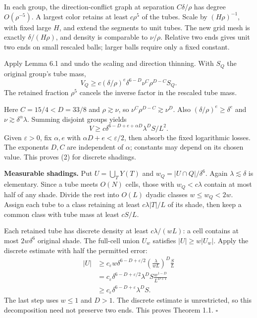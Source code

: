 \documentclass[
  11pt,
  a4paper,
]{article}
\begin{document}
In each group, the direction-conflict graph at separation
\(C\delta/\rho\) has degree \(O(\rho^{-5})\). A largest color retains at
least \(c\rho^5\) of the tubes. Scale by \((H\rho)^{-1}\), with fixed
large \(H\), and extend the segments to unit tubes. The new grid mesh is
exactly \(\delta/(H\rho)\), and density is comparable to \(\nu/\rho\).
Relative two ends gives unit two ends on small rescaled balls; larger
balls require only a fixed constant.

Apply Lemma 6.1 and undo the scaling and direction thinning. With
\(S_Q\) the original group's tube mass, \[
 V_Q\ge c(\delta/\rho)^e\delta^{6-D}
             \nu^C\rho^{D-C}S_Q.
\tag{32}\label{eq:32}
\] The retained fraction \(\rho^5\) cancels the inverse factor in the
rescaled tube mass.

Here \(C=15/4<D=33/8\) and \(\rho\gtrsim\nu\), so
\(\nu^C\rho^{D-C}\gtrsim\nu^D\). Also \((\delta/\rho)^e\ge\delta^e\) and
\(\nu\gtrsim\delta^\alpha\lambda\). Summing disjoint groups yields \[
 V\ge c\delta^{6-D+e+\alpha D}\lambda^DS/L^2.
\] Given \(\varepsilon>0\), fix \(\alpha,e\) with
\(\alpha D+e<\varepsilon/2\), then absorb the fixed logarithmic losses.
The exponents \(D,C\) are independent of \(\alpha\); constants may
depend on its chosen value. This proves (2) for discrete shadings.

\textbf{Measurable shadings.} Put \(U=\bigcup_TY(T)\) and
\(w_Q=|U\cap Q|/\delta^6\). Again \(\lambda\lesssim\delta\) is
elementary. Since a tube meets \(O(N)\) cells, those with
\(w_Q<c\lambda\) contain at most half of any shade. Divide the rest into
\(O(L)\) dyadic classes \(w\le w_Q<2w\). Assign each tube to a class
retaining at least \(c\lambda|T|/L\) of its shade, then keep a common
class with tube mass at least \(cS/L\).

Each retained tube has discrete density at least \(c\lambda/(wL)\): a
cell contains at most \(2w\delta^6\) original shade. The full-cell union
\(U_w\) satisfies \(|U|\ge w|U_w|\). Apply the discrete estimate with
half the permitted error: \[
 \begin{aligned}
 |U|&\ge c_\varepsilon w\delta^{6-D+\varepsilon/2}
             \left(\frac{\lambda}{wL}\right)^D\frac SL\\
 &=c_\varepsilon\delta^{6-D+\varepsilon/2}\lambda^DS
                   \frac{w^{1-D}}{L^{D+1}}\\
 &\ge c_\varepsilon\delta^{6-D+\varepsilon}\lambda^DS.
 \end{aligned}
\] The last step uses \(w\le1\) and \(D>1\). The discrete estimate is
unrestricted, so this decomposition need not preserve two ends. This
proves Theorem 1.1. \(\square\)
\end{document}
